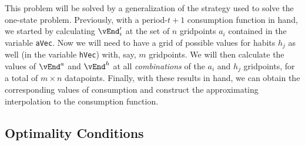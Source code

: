\documentclass[titlepage]{\econtex}
\begin{document}
{  This problem will be solved by a generalization of the strategy used
  to solve the one-state problem.  Previously, with a period-$t+1$
  consumption function in hand, we started by calculating
  $\vEnd^{\prime}_{i}$ at the set of $n$ gridpoints ${a}_{i}$
  contained in the variable \texttt{aVec}.  Now we will need to
  have a grid of possible values for habits $h_{j}$ as well (in the
  variable \texttt{hVec}) with, say, $m$ gridpoints.  We will then
  calculate the values of $\vEnd^{{a}}$ and $\vEnd^{h}$
  at all \textit{combinations} of the ${a}_{i}$ and $h_{j}$
  gridpoints, for a total of $m \times n$ datapoints.  Finally, with
  these results in hand, we can obtain the corresponding values of
  consumption and construct the approximating interpolation to the
  consumption function.

  \hypertarget{Optimality-Conditions}{}
  \subsection{Optimality Conditions}
  \hypertarget{The-First-Orrder-Condition-for-c}{}
}
\end{document}

